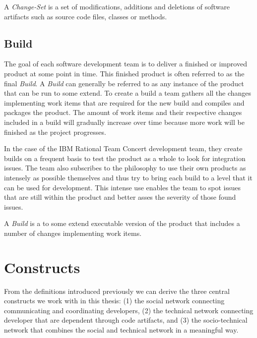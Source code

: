 \begin{note}
\begin{mydef}
A \emph{Change-Set} is a set of modifications, additions and deletions of software artifacts such as source code files, classes or methods.
\end{mydef}
\end{note}

\subsection{Build}
The goal of each software development team is to deliver a finished or improved product at some point in time.
This finished product is often referred to as the final \emph{Build}.
A \emph{Build} can generally be referred to as any instance of the product that can be run to some extend.
To create a build a team gathers all the changes implementing work items that are required for the new build and compiles and packages the product.
The amount of work items and their respective changes included in a build will gradually increase over time because more work will be finished as the project progresses.

In the case of the IBM Rational Team Concert development team, they create builds on a frequent basis to test the product as a whole to look for integration issues. 
The team also subscribes to the philosophy to use their own products as intensely as possible themselves and thus try to bring each build to a level that it can be used for development.
This intense use enables the team to spot issues that are still within the product and better asses the severity of those found issues.

\begin{note}
\begin{mydef}
A \emph{Build} is a to some extend executable version of the product that includes a number of changes implementing work items.
\end{mydef}
\end{note}

\section{Constructs}
\label{c5:sec:constructs}
From the definitions introduced previously we can derive the three central constructs we work with in this thesis: (1) the social network connecting communicating and coordinating developers, (2) the technical network connecting developer that are dependent through code artifacts, and (3) the socio-technical network that combines the social and technical network in a meaningful way.

